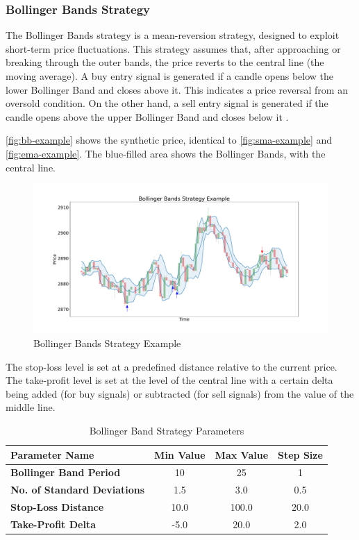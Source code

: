 \subsubsection{Bollinger Bands Strategy}

The Bollinger Bands strategy is a mean-reversion strategy, designed to exploit short-term price fluctuations.
This strategy assumes that, after approaching or breaking through the outer bands, the price reverts to the central line (the moving average).
A buy entry signal is generated if a candle opens below the lower Bollinger Band and closes above it.
This indicates a price reversal from an oversold condition.
On the other hand, a sell entry signal is generated if the candle opens above the upper Bollinger Band and closes below it \cite{bb-basics}.

\autoref{fig:bb-example} shows the synthetic price, identical to \autoref{fig:sma-example} and \autoref{fig:ema-example}.
The blue-filled area shows the Bollinger Bands, with the central line.

\begin{figure}[H]
    \centering
    \includegraphics[width=\textwidth]{images/trading-strategies/bb-example}
    \caption{Bollinger Bands Strategy Example}
    \label{fig:bb-example}
\end{figure}

\noindent
The stop-loss level is set at a predefined distance relative to the current price.
The take-profit level is set at the level of the central line with a certain delta being added (for buy signals) or subtracted (for sell signals) from the value of the middle line.

\begin{table}[H]
    \centering
    \begin{tabular}{L{4cm}ccc}
        \toprule
        \textbf{Parameter Name} & Min Value & Max Value & Step Size
        \\
        \midrule
        \textbf{Bollinger Band Period}      & 10   & 25    & 1    \\
        \textbf{No. of Standard Deviations} & 1.5  & 3.0   & 0.5  \\
        \textbf{Stop-Loss Distance}         & 10.0 & 100.0 & 20.0 \\
        \textbf{Take-Profit Delta}          & -5.0 & 20.0  & 2.0  \\
        \bottomrule
    \end{tabular}
    \caption{Bollinger Band Strategy Parameters}
    \label{tbl:bb-strategy-parameters}
\end{table}
